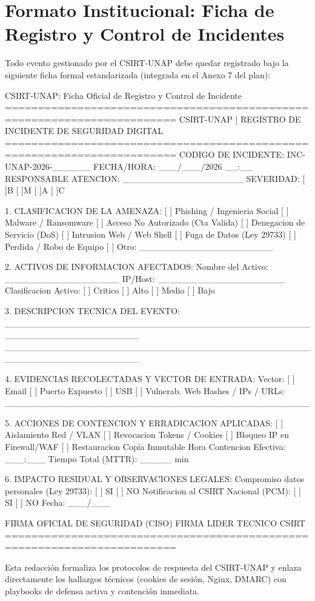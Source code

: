 \section{Formato Institucional: Ficha de Registro y Control de Incidentes}

Todo evento gestionado por el CSIRT-UNAP debe quedar registrado bajo la siguiente ficha formal estandarizada (integrada en el Anexo 7 del plan):

\begin{cmdbox}{CSIRT-UNAP: Ficha Oficial de Registro y Control de Incidente}
========================================================================
         CSIRT-UNAP | REGISTRO DE INCIDENTE DE SEGURIDAD DIGITAL
========================================================================
CODIGO DE INCIDENTE: INC-UNAP-2026-______   FECHA/HORA: ___/___/2026 __:__
RESPONSABLE ATENCION: ___________________   SEVERIDAD: [ ]B [ ]M [ ]A [ ]C

1. CLASIFICACION DE LA AMENAZA:
   [ ] Phishing / Ingenieria Social      [ ] Malware / Ransomware
   [ ] Acceso No Autorizado (Cta Valida) [ ] Denegacion de Servicio (DoS)
   [ ] Intrusion Web / Web Shell         [ ] Fuga de Datos (Ley 29733)
   [ ] Perdida / Robo de Equipo          [ ] Otro: _____________________

2. ACTIVOS DE INFORMACION AFECTADOS:
   Nombre del Activo: __________________   IP/Host: ____________________
   Clasificacion Activo: [ ] Critico   [ ] Alto   [ ] Medio   [ ] Bajo

3. DESCRIPCION TECNICA DEL EVENTO:
   _____________________________________________________________________
   _____________________________________________________________________

4. EVIDENCIAS RECOLECTADAS Y VECTOR DE ENTRADA:
   Vector: [ ] Email   [ ] Puerto Expuesto   [ ] USB   [ ] Vulnerab. Web
   Hashes / IPs / URLs: ________________________________________________

5. ACCIONES DE CONTENCION Y ERRADICACION APLICADAS:
   [ ] Aislamiento Red / VLAN            [ ] Revocacion Tokens / Cookies
   [ ] Bloqueo IP en Firewall/WAF        [ ] Restauracion Copia Inmutable
   Hora Contencion Efectiva: ___:___     Tiempo Total (MTTR): _____ min

6. IMPACTO RESIDUAL Y OBSERVACIONES LEGALES:
   Compromiso datos personales (Ley 29733): [ ] SI   [ ] NO
   Notificacion al CSIRT Nacional (PCM):    [ ] SI   [ ] NO   Fecha: ___/___

FIRMA OFICIAL DE SEGURIDAD (CISO)         FIRMA LIDER TECNICO CSIRT
========================================================================
\end{cmdbox}

Esta redacción formaliza los protocolos de respuesta del CSIRT-UNAP y enlaza directamente los hallazgos técnicos (cookies de sesión, Nginx, DMARC) con playbooks de defensa activa y contención inmediata.